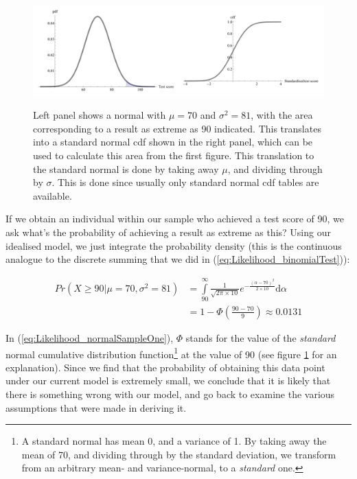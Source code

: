 \documentclass[11pt,fullpage]{book}
\begin{document}
\begin{figure}
\centering
\scalebox{0.35} 
{\includegraphics{likelihood_normal.pdf}}
\caption{Left panel shows a normal with $\mu=70$ and $\sigma^2 = 81$, with the area corresponding to a result as extreme as 90 indicated. This translates into a standard normal cdf shown in the right panel, which can be used to calculate this area from the first figure. This translation to the standard normal is done by taking away $\mu$, and dividing through by $\sigma$. This is done since usually only standard normal cdf tables are available.}\label{fig:Likelihood_normal}
\end{figure}

If we obtain an individual within our sample who achieved a test score of 90, we ask what's the probability of achieving a result as extreme as this? Using our idealised model, we just integrate the probability density (this is the continuous analogue to the discrete summing that we did in (\ref{eq:Likelihood_binomialTest})):

\begin{equation}
\begin{align}
Pr(X\geq 90|\mu=70,\sigma^2=81) &= \int\limits_{90}^{\infty}\frac{1}{\sqrt{2\pi\times 10}}e^{-\frac{(\alpha-70)^2}{2\times 10}} \mathrm{d}\alpha\\
 & = 1-\Phi\left(\frac{90-70}{9}\right) \approx 0.0131
\end{align}\label{eq:Likelihood_normalSampleOne}
\end{equation}

In (\ref{eq:Likelihood_normalSampleOne}), $\Phi$ stands for the value of the \textit{standard} normal cumulative distribution function\footnote{A standard normal has mean 0, and a variance of 1. By taking away the mean of 70, and dividing through by the standard deviation, we transform from an arbitrary mean- and variance-normal, to a \textit{standard} one.} at the value of 90 (see figure \ref{fig:Likelihood_normal} for an explanation). Since we find that the probability of obtaining this data point under our current model is extremely small, we conclude that it is likely that there is something wrong with our model, and go back to examine the various assumptions that were made in deriving it.
\end{document}
